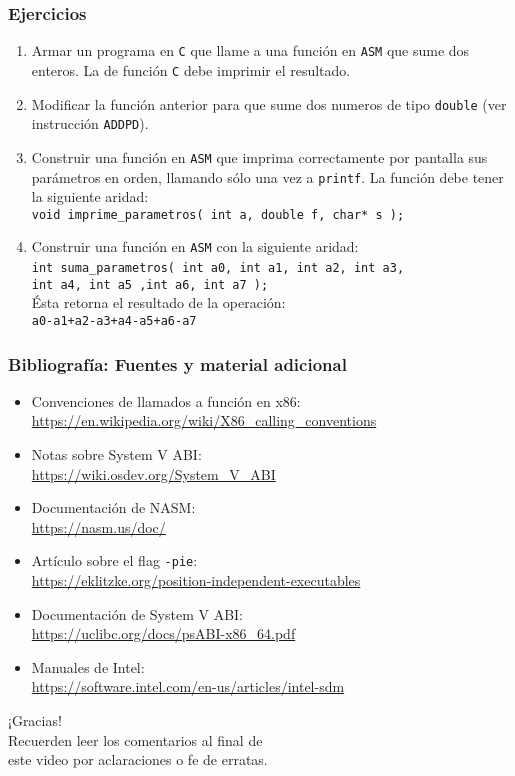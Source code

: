 \documentclass[aspectratio=169]{beamer}
\begin{document}
\begin{frame}[fragile]
    \frametitle{Ejercicios}
    \small
    \begin{enumerate}
    \item Armar un programa en \texttt{C} que llame a una función en \texttt{ASM} que sume dos enteros. La de función \texttt{C} debe imprimir el resultado.
    \medskip
    \item Modificar la función anterior para que sume dos numeros de tipo \texttt{double} (ver instrucción \texttt{ADDPD}).
    \medskip
    \item Construir una función en \texttt{ASM} que imprima correctamente por pantalla sus parámetros en orden, llamando sólo una vez a \texttt{printf}. La función debe tener la siguiente aridad: \\
    \verb=void imprime_parametros( int a, double f, char* s );=
    \medskip
    \item Construir una función en \texttt{ASM} con la siguiente aridad: \\
    \footnotesize
    \verb=int suma_parametros( int a0, int a1, int a2, int a3,=
    \verb=                     int a4, int a5 ,int a6, int a7 );=\\
    \small
    Ésta retorna el resultado de la operación: \\
    \footnotesize
    \verb=a0-a1+a2-a3+a4-a5+a6-a7=
    \end{enumerate}
    \normalsize
\end{frame}

\begin{frame}[fragile]
    \frametitle{Bibliografía: Fuentes y material adicional}
    \begin{itemize}
    \item Convenciones de llamados a función en x86: \\
    \url{https://en.wikipedia.org/wiki/X86_calling_conventions}
    \item Notas sobre System V ABI: \\
    \url{https://wiki.osdev.org/System_V_ABI}
    \item Documentación de NASM: \\
    \url{https://nasm.us/doc/}
    \item Artículo sobre el flag \texttt{-pie}: \\
    \url{https://eklitzke.org/position-independent-executables}
    \item Documentación de System V ABI: \\
    \url{https://uclibc.org/docs/psABI-x86_64.pdf}
    \item Manuales de Intel: \\
    \url{https://software.intel.com/en-us/articles/intel-sdm}
    \end{itemize}
\end{frame}

\begin{frame}[plain]
    \begin{center}
    \vspace{2cm}
    \huge ¡Gracias!\\
    \vspace{2cm}
    \normalsize Recuerden leer los comentarios al final de \\ este video por aclaraciones o fe de erratas.
    \end{center}
\end{frame}
\end{document}
